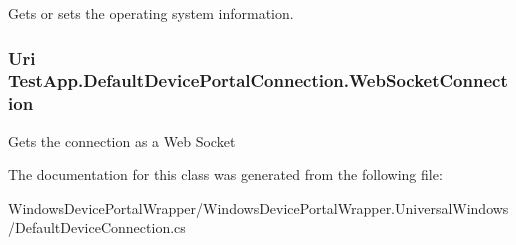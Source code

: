 Gets or sets the operating system information. 

\subsubsection[{\texorpdfstring{Web\+Socket\+Connection}{WebSocketConnection}}]{\setlength{\rightskip}{0pt plus 5cm}Uri Test\+App.\+Default\+Device\+Portal\+Connection.\+Web\+Socket\+Connection\hspace{0.3cm}{\ttfamily [get]}}\hypertarget{class_test_app_1_1_default_device_portal_connection_a4a739c9b24f6ba5ac6021fadd40b77f9}{}\label{class_test_app_1_1_default_device_portal_connection_a4a739c9b24f6ba5ac6021fadd40b77f9}


Gets the connection as a Web Socket 



The documentation for this class was generated from the following file\+:\begin{DoxyCompactItemize}
\item 
Windows\+Device\+Portal\+Wrapper/\+Windows\+Device\+Portal\+Wrapper.\+Universal\+Windows/Default\+Device\+Connection.\+cs\end{DoxyCompactItemize}
